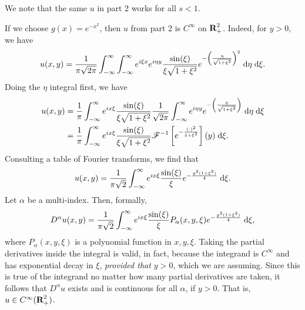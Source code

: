 \documentclass{homework}
\begin{document}
	\question
	
	We note that the same $u$ in part 2 works for all $s < 1$.
	
	\question
	
	If we choose $g(x) = e^{-x^2}$, then $u$ from part 2 is $C^\infty$ on $\textnormal{\bf R}_+^2$. Indeed, for $y>0$, we have
	\begin{equation*}
		u(x,y) = \frac{1}{\pi\sqrt{2\pi}}\int_{-\infty}^\infty\int_{-\infty}^\infty e^{i\xi x}e^{i\eta y}\frac{\sin(\xi)}{\xi\sqrt{1+\xi^2}}e^{-\left(\frac{\eta}{\sqrt{1+\xi^2}}\right)^2}\;\text{d}\eta\;\text{d}\xi.
	\end{equation*}
	Doing the $\eta$ integral first, we have
	\begin{align*}
		u(x,y) &= \frac{1}{\pi}\int_{-\infty}^\infty e^{ix\xi}\frac{\sin(\xi)}{\xi\sqrt{1+\xi^2}} \frac{1}{\sqrt{2\pi}}\int_{-\infty}^\infty e^{i\eta y}e^{-\left(\frac{\eta}{\sqrt{1+\xi^2}}\right)}\;\text{d}\eta\;\text{d}\xi \\
		&= \frac{1}{\pi}\int_{-\infty}^\infty e^{ix\xi}\frac{\sin(\xi)}{\xi\sqrt{1+\xi^2}}\mathscr{F}^{-1}\left[e^{-\frac{(\cdot)^2}{1+\xi^2}}\right](y)\;\text{d}\xi.
	\end{align*}
	Consulting a table of Fourier transforms, we find that
	\begin{equation*}
		u(x,y) = \frac{1}{\pi\sqrt{2}}\int_{-\infty}^\infty e^{ix\xi}\frac{\sin(\xi)}{\xi}e^{-\frac{y^2(1+\xi^2)}{4}}\;\text{d} \xi.
	\end{equation*}
	Let $\alpha$ be a multi-index. Then, formally,
	\begin{equation*}
		D^{\alpha}u(x,y) = \frac{1}{\pi\sqrt{2}}\int_{-\infty}^\infty e^{ix\xi}\frac{\sin(\xi)}{\xi}P_\alpha(x,y,\xi)e^{-\frac{y^2(1+\xi^2)}{4}}\;\text{d} \xi,
	\end{equation*}
	where $P_\alpha(x,y,\xi)$ is a polynomial function in $x,y,\xi$. Taking the partial derivatives inside the integral is valid, in fact, because the integrand is $C^\infty$ and has exponential decay in $\xi$, \textit{provided that $y > 0$}, which we are assuming. Since this is true of the integrand no matter how many partial derivatives are taken, it follows that $D^\alpha u$ exists and is continuous for all $\alpha$, if $y > 0$. That is, $u \in C^\infty(\textnormal{\bf R}_+^2)$.
\end{document}
